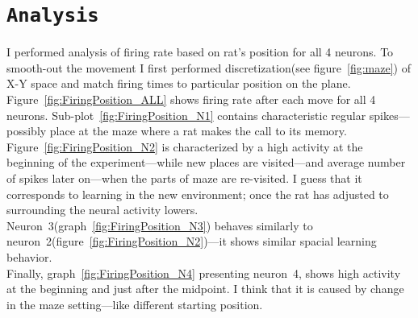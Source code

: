 \documentclass[12pt,a4paper,twocolumn]{article}
\begin{document}


\section*{\texttt{Analysis}}
I performed analysis of firing rate based on rat's position for all 4 neurons. To smooth-out the movement I first performed discretization(see figure~\ref{fig:maze}) of X-Y space and match firing times to particular position on the plane.\\



Figure~\ref{fig:FiringPosition_ALL} shows firing rate after each move for all 4 neurons. Sub-plot~\ref{fig:FiringPosition_N1} contains characteristic regular spikes---possibly place at the maze where a rat makes the call to its memory.\\
Figure~\ref{fig:FiringPosition_N2} is characterized by a high activity at the beginning of the experiment---while new places are visited---and average number of spikes later on---when the parts of maze are re-visited. I guess that it corresponds to learning in the new environment; once the rat has adjusted to surrounding the neural activity lowers.\\
Neuron~3(graph~\ref{fig:FiringPosition_N3}) behaves similarly to neuron~2(figure~\ref{fig:FiringPosition_N2})---it shows similar spacial learning behavior.\\
Finally, graph~\ref{fig:FiringPosition_N4} presenting neuron~4, shows high activity at the beginning and just after the midpoint. I think that it is caused by change in the maze setting---like different starting position.\\
\end{document}
